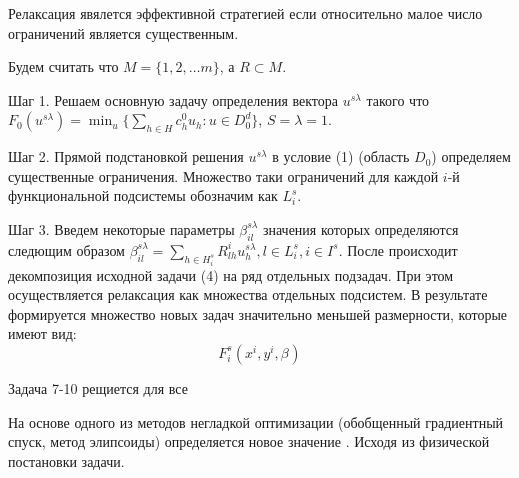 Релаксация явялется эффективной стратегией если относительно малое число ограничений является существенным. 

Будем считать что $M = \{ 1, 2, \dots m \}$, а $R \subset M$.

Шаг 1.
Решаем основную задачу определения вектора $u^{s\lambda}$ такого что $F_0(u^{s\lambda}) = \min_u \{ \sum_{h \in H} c_h^0 u_h : u \in D^d_0 \}$, $S=\lambda=1$.

Шаг 2.
Прямой подстановкой решения $u^{s\lambda}$  в условие (1) (область $D_0$) определяем существенные ограничения. 
Множество таки ограничений для каждой $i$-й функциональной подсистемы обозначим как $L_i^s$.

Шаг 3.
Введем некоторые параметры $\beta_{il}^{s\lambda}$ значения которых определяются следющим образом $\beta_{il}^{s\lambda} = \sum_{h \in H_i^s} R_{lh}^i u_h^{s\lambda}, l \in L_i^s, i \in I^s$. 
После происходит декомпозиция исходной задачи (4) на ряд отдельных подзадач.
При этом осуществляется релаксация как множества отдельных подсистем. 
В результате формируется множество новых задач значительно меньшей размерности, которые имеют вид:
\[
    F_i^s(x^i,y^i, \beta^{})
\]

Задача 7-10 рещиется для все

На основе одного из методов негладкой оптимизации (обобщенный градиентный спуск, метод элипсоиды) определяется новое значение .
Исходя из физической постановки задачи.
